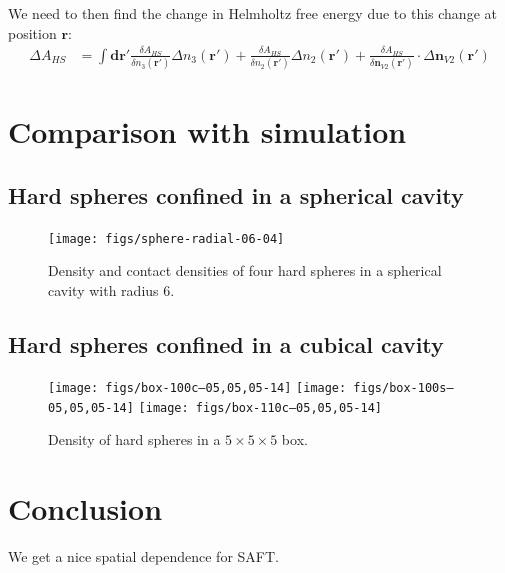 \documentclass[letterpaper,twocolumn,amsmath,amssymb,prb]{revtex4-1}
\begin{document}
\begin{widetext}
We need to then find the change in Helmholtz free energy due to this
change at position $\mathbf{r}$:
\begin{align}
  \Delta A_{HS} &= \int \mathbf{dr}'
  \frac{\delta A_{HS}}{\delta n_3(\mathbf{r}')}\Delta n_3(\mathbf{r}')
  +
  \frac{\delta A_{HS}}{\delta n_2(\mathbf{r}')}\Delta n_2(\mathbf{r}')
  +
  \frac{\delta A_{HS}}{\delta \mathbf{n}_{V2}(\mathbf{r}')} \cdot \Delta \mathbf{n}_{V2}(\mathbf{r}')
\end{align}

\end{widetext}

\section{Comparison with simulation}

\subsection{Hard spheres confined in a spherical cavity}

\begin{figure}
  \texttt{[image: figs/sphere-radial-06-04]}
  \caption{Density and contact densities of four hard spheres in a
    spherical cavity with radius 6.}
  \label{fig:sphere-density}
\end{figure}

\subsection{Hard spheres confined in a cubical cavity}

\begin{figure}
\texttt{[image: figs/box-100c--05,05,05-14]}
\texttt{[image: figs/box-100s--05,05,05-14]}
\texttt{[image: figs/box-110c--05,05,05-14]}
\caption{Density of hard spheres in a $5\times5\times5$ box.}
\label{fig:box-density}
\end{figure}


\section{Conclusion}
We get a nice spatial dependence for SAFT.
\end{document}
